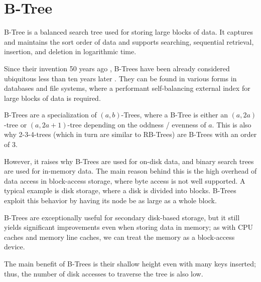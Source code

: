 \section{B-Tree}\label{section:b-tree}

B-Tree is a balanced search tree used for storing large blocks of data. It captures and maintains the sort order of data and supports searching, sequential retrieval, insertion, and deletion in logarithmic time.

Since their invention 50 years ago \cite{bayer-org}, B-Trees have been already considered ubiquitous less than ten years later \cite{10.1145/356770.356776}. They can be found in various forms in databases and file systems, where a performant self-balancing external index for large blocks of data is required.

B-Trees are a specialization of $(a,b)$-Trees, where a B-Tree is either an $(a, 2a)$-tree or $(a, 2a + 1)$-tree depending on the oddness / evenness of $a$. This is also why 2-3-4-trees (which in turn are similar to RB-Trees) are B-Trees with an order of 3.

However, it raises why B-Trees are used for on-disk data, and binary search trees are used for in-memory data. The main reason behind this is the high overhead of data access in block-access storage, where byte access is not well supported. A typical example is disk storage, where a disk is divided into blocks. B-Trees exploit this behavior by having its node be as large as a whole block.

B-Trees are exceptionally useful for secondary disk-based storage, but it still yields significant improvements even when storing data in memory; as with CPU caches and memory line caches, we can treat the memory as a block-access device.

The main benefit of B-Trees is their shallow height even with many keys inserted; thus, the number of disk accesses to traverse the tree is also low.



